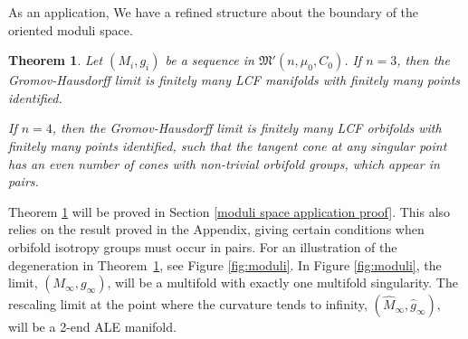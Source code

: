 \documentclass[12pt]{amsart}
\newtheorem{theorem}{Theorem}[section]
\theoremstyle{definition}
\begin{document}
As an application, We have a refined structure about the boundary of the oriented moduli space.

\begin{theorem}\label{t:even}
    Let $(M_i, g_i)$ be a sequence in  $\mathfrak{M}'(n, \mu_0, C_0)$.
    If $n=3$, then the Gromov-Hausdorff limit is finitely many LCF manifolds with finitely many points identified. 

If $n=4$, then the Gromov-Hausdorff limit is finitely many LCF orbifolds with finitely many points identified, such that the tangent cone at any singular point has an even number of cones with non-trivial orbifold groups, which appear in pairs. 
\end{theorem}
Theorem \ref{t:even} will be proved in Section \ref{moduli space application proof}. This also relies on the result proved in the Appendix, giving certain conditions when orbifold isotropy groups must occur in pairs. For an illustration of the degeneration in Theorem~\ref{t:even}, see Figure \ref{fig:moduli}. In Figure \ref{fig:moduli}, the limit, $(M_\infty, g_\infty)$, will be a multifold with exactly one multifold singularity. The rescaling limit at the point where the curvature tends to infinity, $(\hat{M}_\infty, \hat{g}_\infty)$, will be a 2-end ALE manifold.
\end{document}
